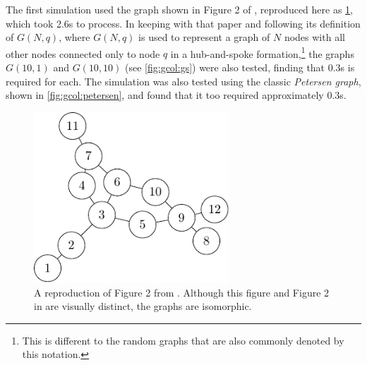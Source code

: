 The first simulation used the graph shown in Figure 2 of \cite{Gheorghe2013}, reproduced here as \cref{fig:gcol:gheorghefig2}, which took 2.6s to process.  In keeping with that paper and following its definition of \(G(N,q)\), where \(G(N,q)\) is used to represent a graph of \(N\) nodes with all other nodes connected only to node \(q\) in a hub-and-spoke formation,\footnote{This is different to the random graphs that are also commonly denoted by this notation.} the graphs \(G(10,1)\) and \(G(10,10)\) (see \cref{fig:gcol:gs}) were also tested, finding that 0.3s is required for each.  The simulation was also tested using the classic \emph{Petersen graph}, shown in \cref{fig:gcol:petersen}, and found that it too required approximately 0.3s.

\begin{figure}
    \centering
    \includegraphics[width=0.65\textwidth]{chapters/gcol/figs/gheorghe-figure-2-figure0.pdf}
    \caption[A reproduction of the graph in Figure 2 of \cite{Gheorghe2013}]{\label{fig:gcol:gheorghefig2}A reproduction of Figure 2 from \cite{Gheorghe2013}.  Although this figure and Figure 2 in \cite{Gheorghe2013} are visually distinct, the graphs are isomorphic.}
\end{figure}

